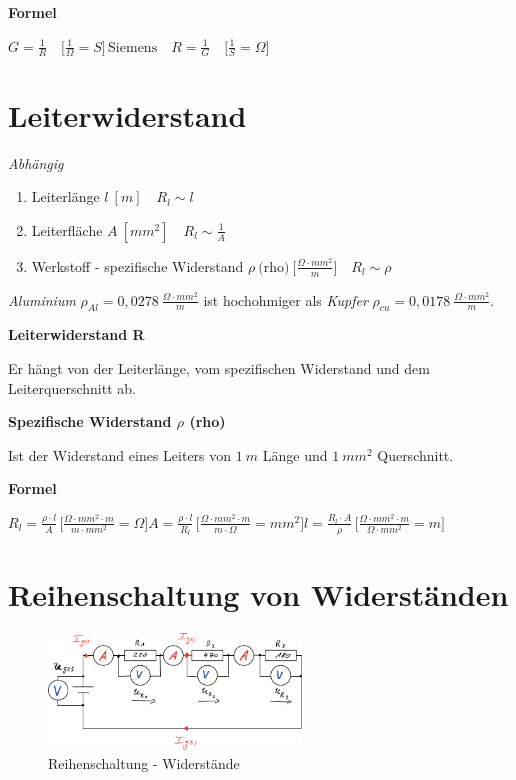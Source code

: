 \textbf{Formel}

$\boxed{G = \frac{1}{R}} \quad \bigl[\frac{1}{\Omega} = S\bigl] \,\text{Siemens} \quad \boxed{R = \frac{1}{G}} \quad \bigl[\frac{1}{S} = \Omega\bigl]$

\section{Leiterwiderstand}\label{leiterwiderstand}

\emph{Abhängig}

\begin{enumerate}
\item
  Leiterlänge $l~[m] \quad R_l \sim l$
\item
  Leiterfläche $A~[mm^2] \quad R_l \sim \frac{1}{A}$
\item
  Werkstoff - spezifische Widerstand
  $\rho~\text{(rho)}~\bigl[\frac{\Omega \cdot mm^2}{m}\bigl] \quad R_l \sim \rho$
\end{enumerate}

\emph{Aluminium} $\rho_{Al} = 0,0278~\frac{\Omega \cdot mm^2}{m}$ ist
hochohmiger als \emph{Kupfer}
$\rho_{cu} = 0,0178~\frac{\Omega \cdot mm^2}{m}$.

\textbf{Leiterwiderstand R}

Er hängt von der Leiterlänge, vom spezifischen Widerstand und dem
Leiterquerschnitt ab.

\textbf{Spezifische Widerstand $\rho$ (rho)}

Ist der Widerstand eines Leiters von $1~m$ Länge und $1~mm^2$
Querschnitt.

\textbf{Formel}

$\boxed{R_l = \frac{\rho \cdot l}{A}} \, \bigl[\frac{\Omega \cdot mm^2 \cdot m}{m \cdot mm^2} = \Omega\bigl] \boxed{A = \frac{\rho \cdot l}{R_l}} \, \bigl[\frac{\Omega \cdot mm^2 \cdot m}{m \cdot \Omega} = mm^2\bigl] \boxed{l = \frac{R_l \cdot A}{\rho}} \, \bigl[\frac{\Omega \cdot mm^2 \cdot m}{\Omega \cdot mm^2} = m\bigl]$

\newpage

\section{Reihenschaltung von
Widerständen}\label{reihenschaltung-von-widerstaenden}

\begin{figure}[!ht]%
\centering
\includegraphics[width=0.6\textwidth]{images/Skizze/07_Reihenschaltung_Widerstaende_Skizze.pdf}
\caption{Reihenschaltung - Widerstände}
\end{figure}

